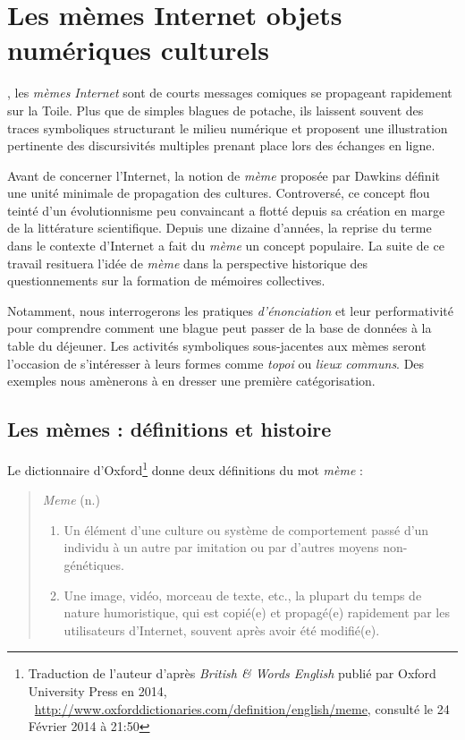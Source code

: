 \chapter[Les mèmes Internet, objets numériques culturels]{Les mèmes Internet
 objets numériques culturels}
\label{chap:memes}

, les \textit{mèmes Internet} sont de courts messages comiques se propageant rapidement sur la Toile. Plus que de simples blagues de potache, ils laissent souvent des traces symboliques structurant le milieu numérique et proposent une illustration pertinente des discursivités multiples prenant place lors des échanges en ligne. 

Avant de concerner l'Internet, la notion de \textit{mème} proposée par Dawkins définit une unité minimale de propagation des cultures. Controversé, ce concept flou teinté d{\textquoteright}un évolutionnisme peu convaincant a flotté depuis sa création en marge de la littérature scientifique. Depuis une dizaine d'années, la reprise du terme dans le contexte d'Internet a fait du \textit{mème} un concept populaire. La suite de ce travail resituera l'idée de \textit{mème} dans la perspective historique des questionnements sur la formation de mémoires collectives.

Notamment, nous interrogerons les pratiques \textit{d{\textquoteright}énonciation} et leur performativité pour comprendre comment une blague peut passer de la base de données à la table du déjeuner. Les activités symboliques sous-jacentes aux mèmes seront l'occasion de s'intéresser à leurs formes comme \textit{topoi} ou \textit{lieux communs}. Des exemples nous amènerons à en dresser une première catégorisation.

\section[Les mèmes : définitions et histoire ]{Les mèmes : définitions et histoire } 

Le dictionnaire d{\textquoteright}Oxford\footnote{Traduction de l'auteur d{\textquoteright}après \textit{British \& Words English} publié par Oxford University Press en 2014, \ \url{http://www.oxforddictionaries.com/definition/english/meme}, consulté le 24 Février 2014 à 21:50} donne deux définitions du mot \textit{mème }: 

\begin{quote}
    \textit{Meme} (n.)

    \begin{enumerate}
        \item Un élément d{\textquoteright}une culture ou système de comportement passé d{\textquoteright}un individu à un autre par imitation ou par d{\textquoteright}autres moyens non-génétiques.
        \item Une image, vidéo, morceau de texte, etc., la plupart du temps de nature humoristique, qui est copié(e) et propagé(e) rapidement par les utilisateurs d{\textquoteright}Internet, souvent après avoir été modifié(e).
    \end{enumerate}

\end{quote}

